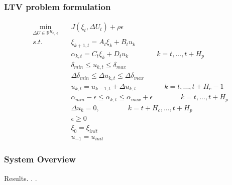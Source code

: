 \documentclass{beamer}
\begin{document}
\begin{frame}
\frametitle{LTV problem formulation }

\begin{align*}
\min_{\Delta U \in \mathbb{R}^{H_p}, \epsilon} \quad &J(\xi_t, \Delta U_t) +
\rho \epsilon \\
s.t. \qquad &\xi_{k+1,t} = A_t \xi_k + B_t u_k \\
&\alpha_{k,t} = C_t \xi_k + D_t u_k \qquad \qquad k = t, . . . , t + H_p \\
&\delta_{min} \leq u_{k,t} \leq \delta_{max} \\ 
&\Delta \delta_{min} \leq \Delta u_{k,t} \leq \Delta \delta_{max} \\
&u_{k,t} = u_{k-1,t} + \Delta u_{k,t} \qquad \qquad k = t, . . ., t + H_c - 1 \\
&\alpha_{min} - \epsilon \leq \alpha_{k,t} \leq \alpha_{max} + \epsilon \qquad
\qquad k = t, . . ., t + H_p\\
&\Delta u_k = 0, \qquad \qquad k = t + H_c, . . . , t + H_p \\
&\epsilon \geq 0 \\
&\xi_0 = \xi_{init} \\
& u_{-1} = u_{init}
\end{align*}

\end{frame}







\begin{frame}
\frametitle{System Overview}
Results. . .

\end{frame}


% 
% 
\end{document}
